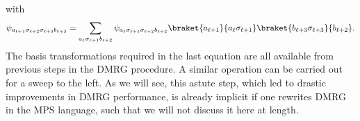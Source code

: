 with
\begin{equation}
\psi_{a_{\ell+1}\sigma_{\ell+2}\sigma_{\ell+3}b_{\ell+3}} =
\sum_{a_\ell \sigma_{\ell+1} b_{\ell+2}} 
\psi_{a_\ell\sigma_{\ell+1}\sigma_{\ell+2}b_{\ell+2}}  
\braket{a_{\ell+1}}{a_\ell \sigma_{\ell+1}} \braket{b_{\ell+3}\sigma_{\ell+3}}{b_{\ell+2}} . 
\end{equation}
The basis transformations required in the last equation are all available from previous steps in the DMRG procedure. A similar operation can be carried out for a sweep to the left. As we will see, this astute step, which led to drastic improvements in DMRG performance, is already implicit if one rewrites DMRG in the MPS language, such that we will not discuss it here at length.

